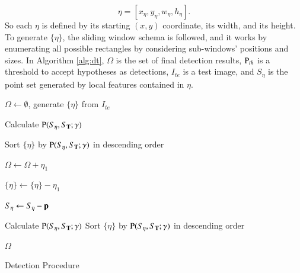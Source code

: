 \documentclass[paper]{ieice}
\begin{document}
\[\eta=[x_{\eta},y_{\eta},w_{\eta},h_{\eta}].\] So each $\eta$ is defined by its starting $(x,y)$ coordinate, its width, and its height. To generate $\{\eta \}$, the sliding window schema is followed, and it works by enumerating all possible rectangles by considering sub-windows' positions and sizes. In Algorithm \ref{alg:dt}, ${\Omega }$ is the set of final detection results, ${\rm P}_{th}$ is a threshold to accept hypotheses as detections, $I_{te}$ is a test image, and $S_{\eta}$ is the point set generated by local features contained in ${\eta}$.


\begin{algorithm}





    \begin{algorithmic}[1]


       \STATE ${\Omega }  \leftarrow \emptyset$, generate $\{\eta \}$ from $I_{te}$

        \FOR{$ \eta \in \{\eta \}$}

     \STATE  Calculate ${\rm P}(S_{\eta},S_{\bf{T}};\gamma)$

        \ENDFOR


    \STATE Sort $\{\eta \}$ by ${\rm P}(S_{\eta},S_{\bf{T}};\gamma)$ in descending order

     \STATE  ${\Omega }  \leftarrow  {\Omega } + \eta_1$

       \STATE  $\{ \eta \}  \leftarrow  \{ \eta \} - \eta_1$

       \FOR {$\eta \in \{\eta \}$}


        \STATE  $S_{\eta} \leftarrow S_{\eta} - \bf{p} $

       \ENDIF
         \ENDFOR
       \ENDFOR
       \STATE  Calculate ${\rm P}(S_{\eta},S_{\bf{T}};\gamma)$
       \ENDFOR
        \STATE Sort $\{\eta \}$ by ${\rm P}(S_{\eta},S_{\bf{T}};\gamma)$ in descending order
    \ENDWHILE

    \RETURN ${\Omega } $


    \end{algorithmic}

    \caption{Detection Procedure}
    \label{alg:dt}

\end{algorithm}
\end{document}
